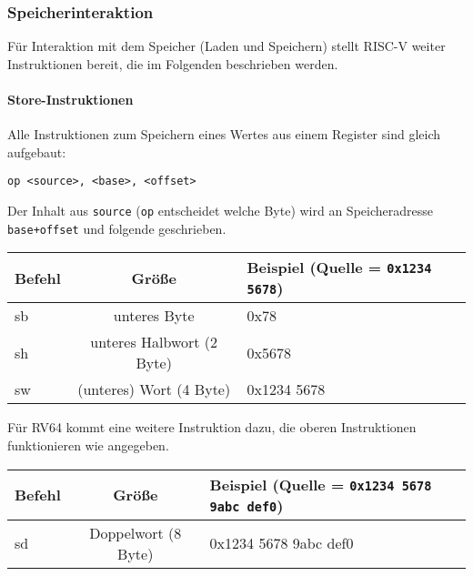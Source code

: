 \subsubsection{Speicherinteraktion}

Für Interaktion mit dem Speicher (Laden und Speichern) stellt RISC-V weiter
Instruktionen bereit, die im Folgenden beschrieben werden.

\paragraph{Store-Instruktionen}

Alle Instruktionen zum Speichern eines Wertes aus einem Register sind gleich
aufgebaut:

\begin{center}
  \texttt{op <source>, <base>, <offset>}
\end{center}

Der Inhalt aus \texttt{source} (\texttt{op} entscheidet welche Byte) wird an
Speicheradresse \texttt{base+offset} und folgende geschrieben.

\begin{table}[H]
  \centering
  \begin{tabular}{>{\ttfamily}lcl}

  	\normalfont\textbf{Befehl} & \textbf{Größe} & \textbf{Beispiel} (Quelle = \texttt{0x1234 5678})\\
    \toprule

  	sb & unteres Byte & 0x78\\

  	sh & unteres Halbwort (2 Byte) & 0x5678\\

  	sw & (unteres) Wort (4 Byte) & 0x1234 5678\\

  \end{tabular}
\end{table}

Für RV64 kommt eine weitere Instruktion dazu, die oberen Instruktionen
funktionieren wie angegeben.

\begin{table}[H]
  \centering
  \begin{tabular}{>{\ttfamily}lcl}
    \normalfont\textbf{Befehl} & \textbf{Größe} & \textbf{Beispiel} (Quelle = \texttt{0x1234 5678 9abc def0})\\
    \toprule

  	sd & Doppelwort (8 Byte) & 0x1234 5678 9abc def0\\

  \end{tabular}
\end{table}

